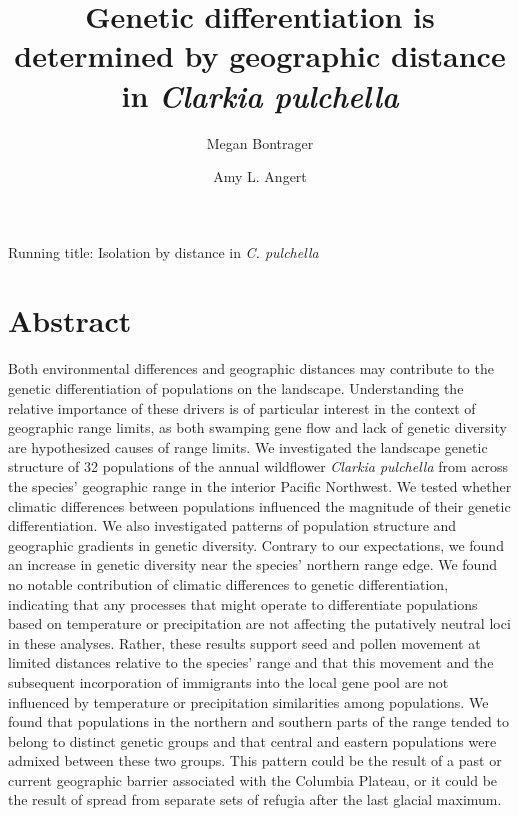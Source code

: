 \documentclass{article}
\begin{document}
\title{Genetic differentiation is determined by geographic distance in \textit{Clarkia pulchella}}
\author[1,3]{Megan Bontrager}
\author[2]{Amy L. Angert}
\date{}
\maketitle

\begin{center}
Running title: Isolation by distance in \textit{C. pulchella}
\end{center}

\clearpage

\linenumbers

\section*{Abstract}

Both environmental differences and geographic distances may contribute to the genetic differentiation of populations on the landscape. Understanding the relative importance of these drivers is of particular interest in the context of geographic range limits, as both swamping gene flow and lack of genetic diversity are hypothesized causes of range limits. We investigated the landscape genetic structure of 32 populations of the annual wildflower \textit{Clarkia pulchella} from across the species' geographic range in the interior Pacific Northwest. We tested whether climatic differences between populations influenced the magnitude of their genetic differentiation. We also investigated patterns of population structure and geographic gradients in genetic diversity. Contrary to our expectations, we found an increase in genetic diversity near the species' northern range edge. We found no notable contribution of climatic differences to genetic differentiation, indicating that any processes that might operate to differentiate populations based on temperature or precipitation are not affecting the putatively neutral loci in these analyses. Rather, these results support seed and pollen movement at limited distances relative to the species' range and that this movement and the subsequent incorporation of immigrants into the local gene pool are not influenced by temperature or precipitation similarities among populations. We found that populations in the northern and southern parts of the range tended to belong to distinct genetic groups and that central and eastern populations were admixed between these two groups. This pattern could be the result of a past or current geographic barrier associated with the Columbia Plateau, or it could be the result of spread from separate sets of refugia after the last glacial maximum. 
\end{document}
